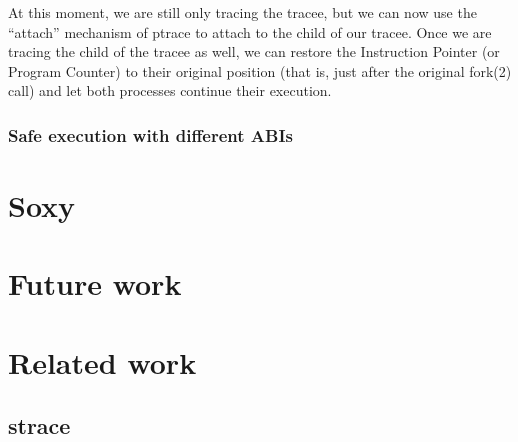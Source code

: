 \documentclass[a4paper, twoside, 10pt, twocolumn]{report}
\begin{document}
At this moment, we are still only tracing the tracee, but we can now use the
``attach'' mechanism of ptrace to attach to the child of our tracee. Once we are
tracing the child of the tracee as well, we can restore the Instruction Pointer
(or Program Counter) to their original position (that is, just after the
original fork(2) call) and let both processes continue their execution.


\subsection{Safe execution with different ABIs}

%

\chapter{Soxy}

\chapter{Future work}


\chapter{Related work}

\section{strace}

\end{document}
